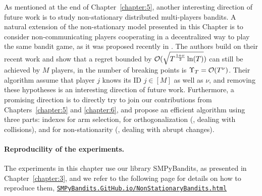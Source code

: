 As mentioned at the end of Chapter~\ref{chapter:5}, another interesting direction of future work is to study non-stationary distributed multi-players bandits.
A natural extension of the non-stationary model presented in this Chapter is to consider non-communicating players cooperating in a decentralized way to play the same bandit game, as it was proposed recently in \cite{WeiSrivastava18Distributed}.
The authors build on their recent work \cite{WeiSrivastava18Abruptly} and show that a regret bounded by $\mathcal{O}(\sqrt{T^{\frac{1+\nu}{2}} \ln(T)})$ can still be achieved by $M$ players, in the number of breaking points is $\Upsilon_T = \mathcal{O}(T^{\nu})$.
Their algorithm assume that player $j$ knows its ID $j\in[M]$ as well as $\nu$, and removing these hypotheses is an interesting direction of future work.
Furthermore, a promising direction is to directly try to join our contributions from Chapters~\ref{chapter:5} and \ref{chapter:6}, and propose an efficient algorithm using three parts:
\klUCB{} indexes for arm selection,
\MCTopM{} for orthogonalization (\ie, dealing with collisions),
and \GLRklUCB{} for non-stationarity (\ie, dealing with abrupt changes).
%



\paragraph{Reproducility of the experiments.}
%
The experiments in this chapter use our library SMPyBandits, as presented in Chapter~\ref{chapter:3},
and we refer to the following page for details on how to reproduce them,
\href{https://SMPyBandits.GitHub.io/NonStationaryBandits.html}{\texttt{SMPyBandits.GitHub.io/NonStationaryBandits.html}}
